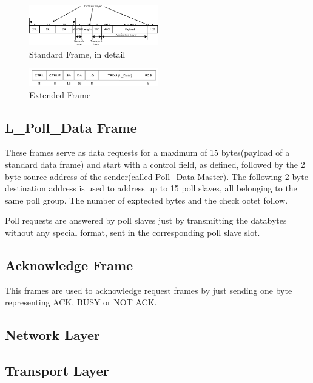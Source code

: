 \begin{figure}
    \centering
    \includegraphics[width=0.5\textwidth]{figures/standardFrame.png}
    \caption{Standard Frame, in detail}
    \label{fig:stdFrameDetail}
\end{figure}

\begin{figure}
    \centering
    \includegraphics[width=0.5\textwidth]{figures/extendedframe.png}
    \caption{Extended Frame}
    \label{fig:extframe}
\end{figure}

\subsection{L\_Poll\_Data Frame}

These frames serve as data requests for a maximum of 15 bytes(payload of a standard
data frame) and start with a control field, as defined, followed by the 2 byte source address
of the sender(called Poll\_Data Master). The following 2 byte destination address is 
used to address up to 15 poll slaves, all belonging to the same poll group. The number of
exptected bytes and the check octet follow.

Poll requests are answered by poll slaves just by transmitting the databytes without any
special format, sent in the corresponding poll slave slot.

\subsection{Acknowledge Frame}

This frames are used to acknowledge request frames by just sending one byte representing
ACK, BUSY or NOT ACK.

\subsection{Network Layer}

\subsection{Transport Layer}

